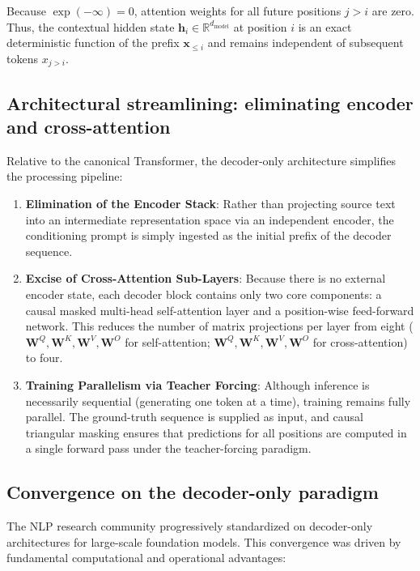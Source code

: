 \documentclass[../../../main.tex]{subfiles}
\begin{document}
Because $\exp(-\infty) = 0$, attention weights for all future positions $j > i$ are zero. Thus, the contextual hidden state $\mathbf{h}_i \in \mathbb{R}^{d_{\text{model}}}$ at position $i$ is an exact deterministic function of the prefix $\mathbf{x}_{\le i}$ and remains independent of subsequent tokens $x_{j > i}$.


\subsection{Architectural streamlining: eliminating encoder and cross-attention}
\label{subsec:decoder_streamlining}

Relative to the canonical Transformer, the decoder-only architecture simplifies the processing pipeline:

\begin{enumerate}
    \item \textbf{Elimination of the Encoder Stack}: Rather than projecting source text into an intermediate representation space via an independent encoder, the conditioning prompt is simply ingested as the initial prefix of the decoder sequence.
    \item \textbf{Excise of Cross-Attention Sub-Layers}: Because there is no external encoder state, each decoder block contains only two core components: a causal masked multi-head self-attention layer and a position-wise feed-forward network. This reduces the number of matrix projections per layer from eight ($\mathbf{W}^Q, \mathbf{W}^K, \mathbf{W}^V, \mathbf{W}^O$ for self-attention; $\mathbf{W}^Q, \mathbf{W}^K, \mathbf{W}^V, \mathbf{W}^O$ for cross-attention) to four.
    \item \textbf{Training Parallelism via Teacher Forcing}: Although inference is necessarily sequential (generating one token at a time), training remains fully parallel. The ground-truth sequence is supplied as input, and causal triangular masking ensures that predictions for all positions are computed in a single forward pass under the teacher-forcing paradigm.
\end{enumerate}


\subsection{Convergence on the decoder-only paradigm}
\label{subsec:decoder_only_dominance}

The NLP research community progressively standardized on decoder-only architectures for large-scale foundation models. This convergence was driven by fundamental computational and operational advantages:
\end{document}
